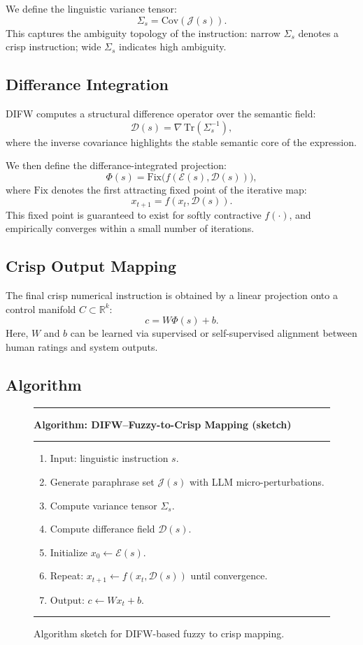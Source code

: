 \documentclass[11pt]{article}
\begin{document}
We define the linguistic variance tensor:
\[
\Sigma_s = \mathrm{Cov}(\mathcal{J}(s)).
\]
This captures the ambiguity topology of the instruction: narrow $\Sigma_s$ denotes a crisp instruction; wide $\Sigma_s$ indicates high
ambiguity.

\subsection{Differance Integration}

DIFW computes a structural difference operator over the semantic field:
\[
\mathcal{D}(s) = \nabla \, \mathrm{Tr}(\Sigma_s^{-1}),
\]
where the inverse covariance highlights the stable semantic core of the
expression.

We then define the differance-integrated projection:
\[
\Phi(s) = \mathrm{Fix}\big( f(\mathcal{E}(s), \mathcal{D}(s)) \big),
\]
where $\mathrm{Fix}$ denotes the first attracting fixed point of the iterative
map:
\[
x_{t+1} = f(x_t, \mathcal{D}(s)).
\]
This fixed point is guaranteed to exist for softly contractive $f(\cdot)$, and empirically converges within a small number of iterations.

\subsection{Crisp Output Mapping}

The final crisp numerical instruction is obtained by a linear projection onto a
control manifold $C \subset \mathbb{R}^k$:
\[
c = W \Phi(s) + b.
\]
Here, $W$ and $b$ can be learned via supervised or self-supervised alignment
between human ratings and system outputs.

\subsection{Algorithm}

\begin{figure}[H]
\centering
\begin{minipage}{0.9\textwidth}
\rule{\textwidth}{0.5pt}
\vspace{2pt}
\noindent
\textbf{Algorithm: DIFW--Fuzzy-to-Crisp Mapping (sketch)}\\
\rule{\textwidth}{0.5pt}
\begin{enumerate}
  \item Input: linguistic instruction $s$.
  \item Generate paraphrase set $\mathcal{J}(s)$ with LLM micro-perturbations.
  \item Compute variance tensor $\Sigma_s$.
  \item Compute differance field $\mathcal{D}(s)$.
  \item Initialize $x_0 \leftarrow \mathcal{E}(s)$.
  \item Repeat: $x_{t+1} \leftarrow f(x_t, \mathcal{D}(s))$ until convergence.
  \item Output: $c \leftarrow W x_t + b$.
\end{enumerate}
\rule{\textwidth}{0.5pt}
\end{minipage}
\caption{Algorithm sketch for DIFW-based fuzzy to crisp mapping.}
\end{figure}
\end{document}
